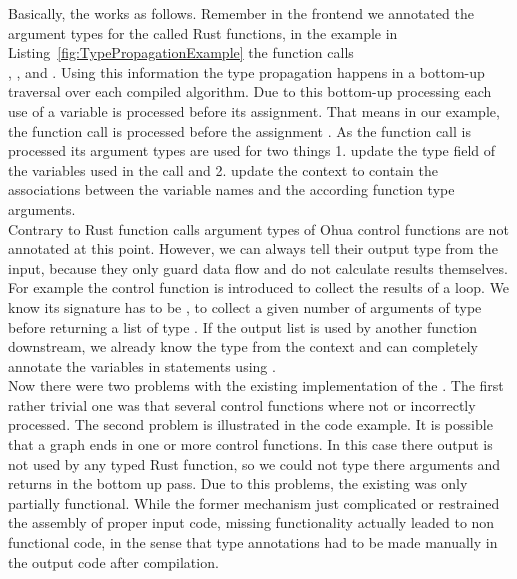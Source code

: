 Basically, the  works as follows. Remember in the frontend we annotated the argument types for the called Rust functions, in the example in Listing~\ref{fig:TypePropagationExample} the function calls\\ , ,  and . Using this information the type propagation happens in a bottom-up traversal over each compiled algorithm. Due to this bottom-up processing each use of a variable is processed before its assignment. That means in our example, the function call 
 is processed before the assignment . As the function call is processed its argument types are used for two things 1. update the type field of the variables used in the call and 2. update the context to contain the associations between the variable names and the according function type arguments. \\

Contrary to Rust function calls argument types of Ohua control functions are not annotated at this point. However, we can always tell their output type from the input, because they only guard data flow and do not calculate results themselves. For example the  control function is introduced to collect the results of a loop. We know its signature has to be , to collect a given number of arguments of type  before returning a list of type \code{[A]}. If the output list is used by another function downstream, we already know the type  from the context and can completely annotate the variables in statements using .\\

Now there were two problems with the existing implementation of the . The first rather trivial one was that several control functions where not or incorrectly processed. The second problem is illustrated in the  code example. It is possible that a graph ends in one or more control functions. In this case there output is not used by any typed Rust function, so we could not type there arguments and returns in the bottom up pass. Due to this problems, the existing  was only partially functional. While the former  mechanism just complicated or restrained the assembly of proper input code, missing  functionality actually leaded to non functional code, in the sense that type annotations had to be made manually in the output code after compilation.  \\

